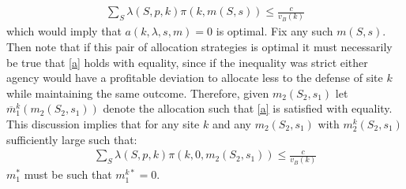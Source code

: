 \documentclass[12pt]{article}
\begin{document}
\begin{align}
\sum_S\lambda(S,p,k)\pi(k,m(S,s))\leq\frac{c}{v_B(k)}\label{a}
\end{align}which would imply that $a(k,\lambda,s,m)=0$ is optimal.  Fix any such $m(S,s)$.  Then note that if this pair of allocation strategies is optimal it must necessarily be true that \eqref{a} holds with equality, since if the inequality was strict either agency would have a profitable deviation to allocate less to the defense of site $k$ while maintaining the same outcome.  Therefore, given $m_2(S_2,s_1)$ let $\overline{m}_1^k(m_2(S_2,s_1))$ denote the allocation such that \eqref{a} is satisfied with equality.  This discussion implies that for any site $k$ and any $m_2(S_2,s_1)$ with $m_2^k(S_2,s_1)$ sufficiently large such that:
\begin{align*}
\sum_S\lambda(S,p,k)\pi(k,0,m_2(S_2,s_1))\leq\frac{c}{v_B(k)}
\end{align*}$m_1^*$ must be such that $m_1^{k*}=0$.  %
\end{document}
